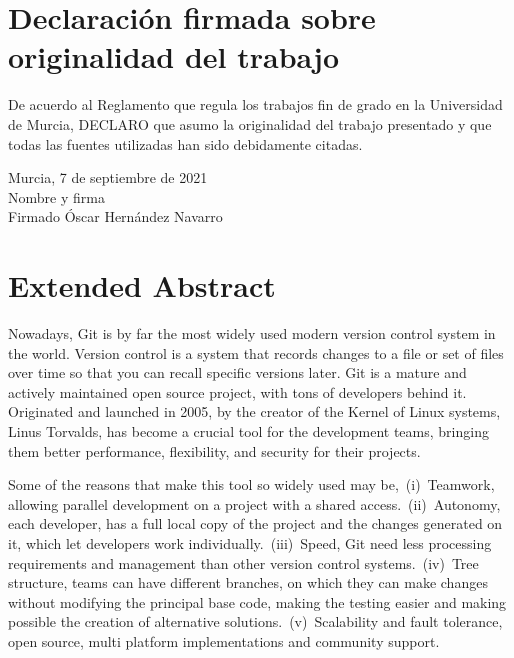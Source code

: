 \chapter*{Declaración firmada sobre originalidad del
  trabajo\label{cap:orginalidad}}

De acuerdo al Reglamento que regula los trabajos fin de grado en la
Universidad de Murcia, DECLARO que asumo la originalidad del trabajo
presentado y que todas las fuentes utilizadas han sido debidamente citadas.

\vspace{10em}

\begin{raggedleft}
Murcia, 7 de septiembre de 2021\\

Nombre y firma\\

Firmado Óscar Hernández Navarro\\

\end{raggedleft}

\chapter*{Extended Abstract\label{00Abstractsummary}}
Nowadays, Git is by far the most widely used modern version control system
in the world. Version control is a system that records changes to a
file or set of files over time so that you can recall specific versions
later. Git is a mature and actively maintained open source project, with
tons of developers behind it. Originated and launched in 2005, by the
creator of the Kernel of Linux systems, Linus Torvalds, has become a
crucial tool for the development teams, bringing them better performance,
flexibility, and security for their projects.

Some of the reasons that make this tool so widely used may
be,~(i)~Teamwork, allowing parallel development on a project with a shared
access.~(ii)~Autonomy, each developer, has a full local copy of the project
and the changes generated on it, which let developers work
individually.~(iii)~Speed, Git need less processing requirements and
management than other version control systems.~(iv)~Tree structure, teams
can have different branches, on which they can make changes without
modifying the principal base code, making the testing easier and making
possible the creation of alternative solutions.~(v)~Scalability and fault
tolerance, open source, multi platform implementations and community
support.

